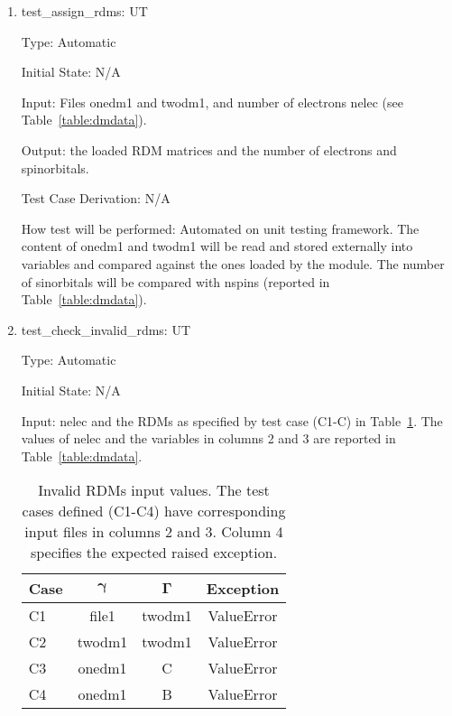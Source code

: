 \documentclass[12pt, titlepage]{article}
\newcounter{utnum} %
\begin{document}
\begin{enumerate}
	
	\item{test\_assign\_rdms:  UT\theutnum 
		\label{UT6}\\}
	
	Type: Automatic
	
	Initial State: N/A
	
	Input: Files onedm1 and twodm1, and number of electrons nelec (see 
	Table~\ref{table:dmdata}).
	
	Output: the loaded RDM matrices and the number of electrons and 
	spinorbitals.
	
	Test Case Derivation: N/A
	
	How test will be performed: Automated on unit testing framework. The 
	content of onedm1 and twodm1 will be read and stored externally into 
	variables and compared against the ones loaded by the module. The number of 
	sinorbitals will be compared with nspins (reported in 
	Table~\ref{table:dmdata}).
	
	\item{test\_check\_invalid\_rdms:  UT\theutnum 
		\label{UT7}\\}
	
	Type: Automatic
	
	Initial State: N/A
	
	Input: nelec and the RDMs as specified by test case (C1-C) in 
	Table~\ref{table:wrongdms}. The values of nelec and the variables in 
	columns 2 and 3 are reported in Table~\ref{table:dmdata}.
	\begin{table}[h!]
		\centering
		\begin{tabular}{lccc}
			Case & $\boldsymbol{\gamma}$ & $\boldsymbol{\Gamma}$ & Exception  
			\\ \toprule
			C1   &    file1     &    twodm1    & ValueError \\
			C2   &    twodm1    &    twodm1    & ValueError \\
			C3   &    onedm1    &      C       & ValueError \\
			C4   &    onedm1    &      B       & ValueError \\ \bottomrule
		\end{tabular}
		\caption{Invalid RDMs input values. The test cases defined (C1-C4) 
			have corresponding input files in columns 2 and 3. Column 4 
			specifies the expected raised exception.}
		\label{table:wrongdms}
	\end{table}
	

\end{enumerate}
\end{document}
